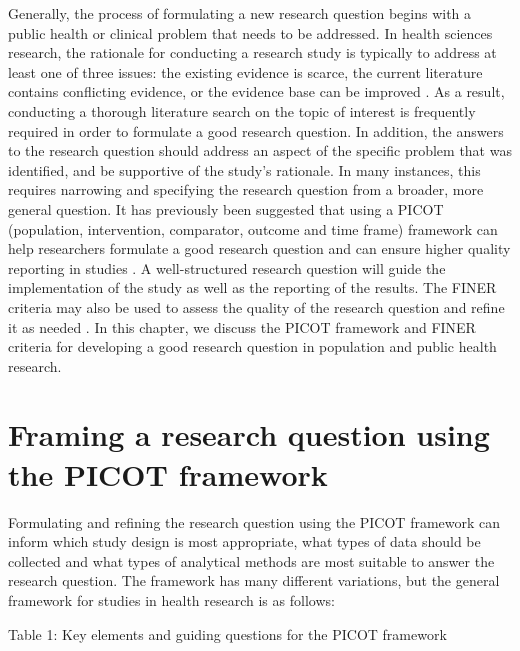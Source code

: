 \documentclass[
]{book}
\begin{document}
Generally, the process of formulating a new research question begins with a public health or clinical problem that needs to be addressed. In health sciences research, the rationale for conducting a research study is typically to address at least one of three issues: the existing evidence is scarce, the current literature contains conflicting evidence, or the evidence base can be improved \citep{fandino2019formulating}. As a result, conducting a thorough literature search on the topic of interest is frequently required in order to formulate a good research question. In addition, the answers to the research question should address an aspect of the specific problem that was identified, and be supportive of the study's rationale. In many instances, this requires narrowing and specifying the research question from a broader, more general question. It has previously been suggested that using a PICOT (population, intervention, comparator, outcome and time frame) framework can help researchers formulate a good research question and can ensure higher quality reporting in studies \citep{thabane2009posing, rios2010association}. A well-structured research question will guide the implementation of the study as well as the reporting of the results. The FINER criteria may also be used to assess the quality of the research question and refine it as needed \citep{thabane2009posing}. In this chapter, we discuss the PICOT framework and FINER criteria for developing a good research question in population and public health research.

\hypertarget{framing-a-research-question-using-the-picot-framework}{%
\section{Framing a research question using the PICOT framework}\label{framing-a-research-question-using-the-picot-framework}}

Formulating and refining the research question using the PICOT framework can inform which study design is most appropriate, what types of data should be collected and what types of analytical methods are most suitable to answer the research question. The framework has many different variations, but the general framework for studies in health research is as follows:

Table 1: Key elements and guiding questions for the PICOT framework
\end{document}
